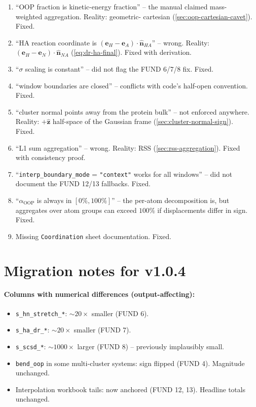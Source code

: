 \documentclass[10pt,a4paper,twoside]{article}
\newcommand{\evec}{\mathbf{e}}
\newcommand{\zhat}{\hat{\mathbf{z}}}
\newcommand{\nhat}{\hat{\mathbf{n}}}
\newcommand{\OOP}{\mathrm{OOP}}
\newcommand{\fn}[1]{\texttt{#1}}
\begin{document}
\begin{enumerate}
  \item ``OOP fraction is kinetic-energy fraction'' -- the manual
        claimed mass-weighted aggregation. Reality: geometric-
        cartesian (\cref{sec:oop-cartesian-cavet}). Fixed.
  \item ``HA reaction coordinate is $(\evec_H - \evec_A) \cdot
        \nhat_{HA}$'' -- wrong. Reality:
        $(\evec_H - \evec_N) \cdot \nhat_{NA}$
        (\cref{eq:dr-ha-final}). Fixed with derivation.
  \item ``$\sigma$ scaling is constant'' -- did not flag the
        FUND 6/7/8 fix. Fixed.
  \item ``window boundaries are closed'' -- conflicts with code's
        half-open convention. Fixed.
  \item ``cluster normal points away from the protein bulk'' --
        not enforced anywhere. Reality: $+\zhat$ half-space of the
        Gaussian frame (\cref{sec:cluster-normal-sign}). Fixed.
  \item ``L1 sum aggregation'' -- wrong. Reality: RSS
        (\cref{sec:rss-aggregation}). Fixed with consistency
        proof.
  \item ``\fn{interp\_boundary\_mode} = \texttt{"context"} works
        for all windows'' -- did not document the FUND 12/13
        fallbacks. Fixed.
  \item ``$\alpha_{\OOP}$ is always in $[0\%, 100\%]$'' -- the
        per-atom decomposition is, but aggregates over atom groups
        can exceed $100\%$ if displacements differ in sign. Fixed.
  \item Missing \texttt{Coordination} sheet documentation. Fixed.
\end{enumerate}

\section{Migration notes for v1.0.4}
\label{sec:migration}

\paragraph{Columns with numerical differences (output-affecting):}
\begin{itemize}
  \item \texttt{s\_hn\_stretch\_*}: $\sim 20\times$ smaller
        (FUND 6).
  \item \texttt{s\_ha\_dr\_*}: $\sim 20\times$ smaller (FUND 7).
  \item \texttt{s\_scsd\_*}: $\sim 1000\times$ larger
        (FUND 8) -- previously implausibly small.
  \item \texttt{bend\_oop} in some multi-cluster systems: sign
        flipped (FUND 4). Magnitude unchanged.
  \item Interpolation workbook tails: now anchored
        (FUND 12, 13). Headline totals unchanged.
\end{itemize}
\end{document}
